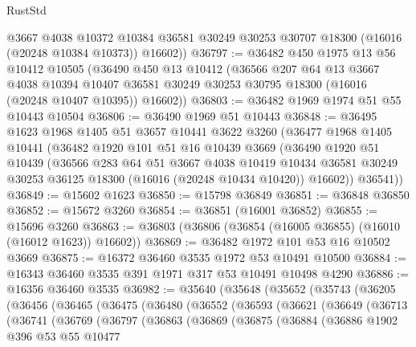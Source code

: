 \begin{lexlean}{RustStd}
\begin{coremodule}
        @3667
        @4038
        @10372
        @10384
        @36581
        @30249
        @30253
        @30707
        @18300
        (@16016 (@20248 @10384 @10373))
        @16602))
@36797 := @36482
    @450
    @1975
    @13
    @56
    @10412
    @10505
    (@36490
      @450
      @13
      @10412
      (@36566
        @207
        @64
        @13
        @3667
        @4038
        @10394
        @10407
        @36581
        @30249
        @30253
        @30795
        @18300
        (@16016 (@20248 @10407 @10395))
        @16602))
@36803 := @36482 @1969 @1974 @51 @55 @10443 @10504
@36806 := @36490 @1969 @51 @10443
@36848 := @36495
    @1623
    @1968
    @1405
    @51
    @3657
    @10441
    @3622
    @3260
    (@36477
      @1968
      @1405
      @10441
      (@36482
        @1920
        @101
        @51
        @16
        @10439
        @3669
        (@36490
          @1920
          @51
          @10439
          (@36566
            @283
            @64
            @51
            @3667
            @4038
            @10419
            @10434
            @36581
            @30249
            @30253
            @36125
            @18300
            (@16016 (@20248 @10434 @10420))
            @16602))
        @36541))
@36849 := @15602 @1623
@36850 := @15798 @36849
@36851 := @36848 @36850
@36852 := @15672 @3260
@36854 := @36851 (@16001 @36852)
@36855 := @15696 @3260
@36863 := @36803 (@36806 (@36854 (@16005 @36855) (@16010 (@16012 @1623)) @16602))
@36869 := @36482 @1972 @101 @53 @16 @10502 @3669
@36875 := @16372 @36460 @3535 @1972 @53 @10491 @10500
@36884 := @16343 @36460 @3535 @391 @1971 @317 @53 @10491 @10498 @4290
@36886 := @16356 @36460 @3535
@36982 := @35640
    (@35648
      (@35652
        (@35743
          (@36205
            (@36456
              (@36465
                (@36475
                  (@36480
                    (@36552
                      (@36593
                        (@36621
                          (@36649
                            (@36713
                              (@36741
                                (@36769
                                  (@36797
                                    (@36863
                                      (@36869
                                        (@36875
                                          (@36884
                                            (@36886
                                              @1902
                                              @396
                                              @53
                                              @55
                                              @10477

\end{coremodule}
\end{lexlean}
